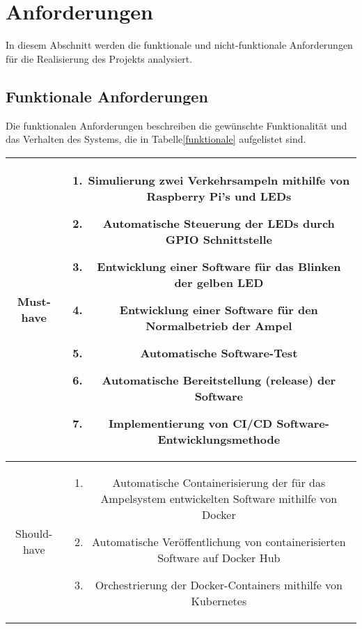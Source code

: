 \section{Anforderungen}\label{anforderungen}

In diesem Abschnitt werden die funktionale und nicht-funktionale Anforderungen für die Realisierung des Projekts analysiert.


\subsection{Funktionale Anforderungen}

Die funktionalen Anforderungen beschreiben die gewünschte Funktionalität und das Verhalten des Systems, die in Tabelle\ref{funktionale} aufgelistet sind.


\begin{table}[h!]
	\begin{flushleft}
		{\small 
			\begin{tabular}{|c|c|}
				\hline
				Must-have & 
				\begin{minipage}{5in}
					 \begin{enumerate}
					 	\item Simulierung zwei Verkehrsampeln mithilfe von Raspberry Pi’s und LEDs
					 	\item Automatische Steuerung der LEDs durch GPIO Schnittstelle
					 	\item Entwicklung einer Software für das Blinken der gelben LED
					 	\item Entwicklung einer Software für den Normalbetrieb der Ampel
					 	\item Automatische Software-Test
					 	\item Automatische Bereitstellung (release) der Software
					 	\item Implementierung von CI/CD Software-Entwicklungsmethode
					 \end{enumerate}
				\end{minipage} \\
				\hline
				Should-have & 
				\begin{minipage}{5in}
					\begin{enumerate}
						\item Automatische Containerisierung der für das Ampelsystem entwickelten Software mithilfe von Docker
						\item Automatische Veröffentlichung von containerisierten Software auf Docker Hub
						\item Orchestrierung der Docker-Containers mithilfe von Kubernetes

\end{enumerate}
\end{minipage}
\end{tabular}}
\end{flushleft}
\end{table}
